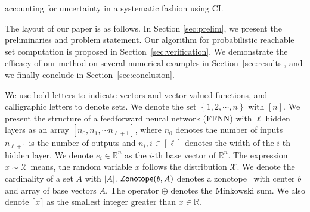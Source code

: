 accounting for uncertainty in a systematic fashion using CI.

The layout of our paper is as follows.  In Section \ref{sec:prelim}, we present the preliminaries 
and problem statement. Our algorithm for probabilistic reachable set computation is proposed in 
Section~\ref{sec:verification}. We demonstrate the efficacy of our method on several numerical 
examples in Section~\ref{sec:results}, and we finally conclude in Section~\ref{sec:conclusion}.


 We use bold letters to indicate vectors and vector-valued functions, and 
calligraphic letters to denote sets. We denote the set $\left\{1,2,\cdots, n \right\}$ with $[n]$. 
We present the structure of a feedforward neural network (FFNN) with $\ell$  hidden layers as 
an array $[n_0,n_1,\cdots n_{\ell+1}]$, where $n_0$ denotes the number of inputs $n_{\ell+1}$ 
is the number of outputs and $n_i , i\in [\ell]$ denotes the width of the $i$-th hidden layer. 
We denote $e_i\in\mathbb{R}^n$ as the $i$-th base vector of $\mathbb{R}^n$. The expression $x \sim 
\mathcal{X}$ means, the random variable $x$ follows the distribution $\mathcal{X}$. We denote the
cardinality of a set $A$ with $|A|$. $\mathsf{Zonotope}(b, A)$ denotes a zonotope~\cite{kurzhanski2002ellipsoidal} 
with center $b$ and array of base vectors $A$. The operator $\oplus$ denotes the Minkowski sum. We
also denote $\lceil x \rceil$ as the smallest integer greater than $x \in \mathbb{R}$.




